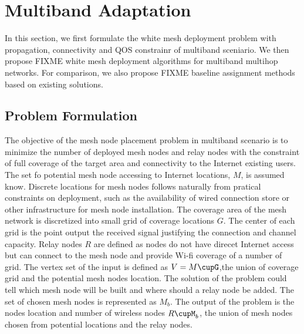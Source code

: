 \section{Multiband Adaptation}
\label{sec:model}

In this section, we first formulate the 
white mesh deployment problem
with propagation, connectivity and QOS constrainr of multiband sceniario.
We then propose {FIXME} white mesh deployment algorithms for multiband multihop networks. For comparison, we also propose {FIXME} baseline assignment methods based on existing solutions.

\subsection{Problem Formulation}
The objective of the mesh node placement problem in multiband scenario is to minimize the number of deployed mesh nodes and relay nodes with the constraint of full coverage of the target area and connectivity to the Internet existing users. 
The set fo potential mesh node accessing to Internet locations, $M$, is assumed know. 
Discrete locations for mesh nodes follows naturally from pratical constraints on deployment, such as the availability of wired connection store or other infrastructure for mesh node installation.
The coverage area of the mesh network is discretized into small grid of coverage locations $G$. The center of each grid is the point output the received signal justifying the connection and channel capacity.
Relay nodes $R$  are defined as nodes do not have direcet Internet access but can connect to the mesh node and provide Wi-fi coverage of a number of grid.
The vertex set of the input is defined as $V=M\cupG$,the union of  coverage grid and the potential mesh nodes location. 
The solution of the problem could tell which mesh node will be built and where should a relay node be added. The set of chosen mesh nodes is represented as $M_b$. 
The output of the problem is the nodes location and number of wireless nodes $R\cupM_b$, the union of mesh nodes chosen from potential locations and the relay nodes. 

